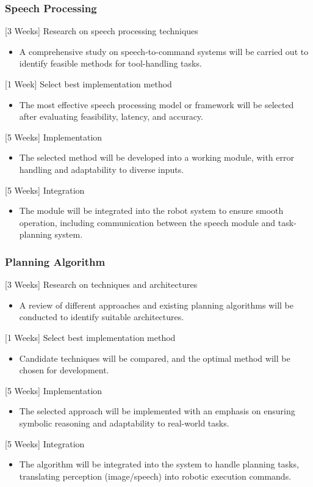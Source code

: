 \documentclass[12pt]{extarticle}
\begin{document}
\subsubsection{Speech Processing}
[3 Weeks] Research on speech processing techniques
\begin{itemize}
    \item A comprehensive study on speech-to-command systems will be carried out to identify feasible methods for tool-handling tasks.
\end{itemize}
[1 Week] Select best implementation method
\begin{itemize}
    \item The most effective speech processing model or framework will be selected after evaluating feasibility, latency, and accuracy.
\end{itemize}
[5 Weeks] Implementation
\begin{itemize}
    \item The selected method will be developed into a working module, with error handling and adaptability to diverse inputs.
\end{itemize}
[5 Weeks] Integration
\begin{itemize}
    \item The module will be integrated into the robot system to ensure smooth operation, including communication between the speech module and task-planning system.
\end{itemize}
\subsubsection{Planning Algorithm}
[3 Weeks] Research on techniques and architectures
\begin{itemize}
    \item A review of different approaches and existing planning algorithms will be conducted to identify suitable architectures.
\end{itemize}
[1 Weeks] Select best implementation method
\begin{itemize}
    \item Candidate techniques will be compared, and the optimal method will be chosen for development.
\end{itemize}
[5 Weeks] Implementation
\begin{itemize}
    \item The selected approach will be implemented with an emphasis on ensuring symbolic reasoning and adaptability to real-world tasks.
\end{itemize}
[5 Weeks] Integration
\begin{itemize}
    \item The algorithm will be integrated into the system to handle planning tasks, translating perception (image/speech) into robotic execution commands.
\end{itemize}
\end{document}
